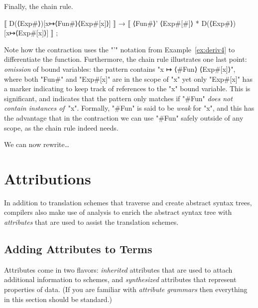 \documentclass[11pt]{article} %
\begin{document}
\begin{example}
  Finally, the chain rule.
\begin{code}[firstnumber=last]
⟦ D(⟨Exp#⟩)[x↦⟨Fun#⟩⟨Exp#[x]⟩] ⟧ → ⟦ ⟨Fun#⟩' ⟨Exp#[#]⟩ * D(⟨Exp#⟩)[x↦⟨Exp#[x]⟩] ⟧ ;
\end{code}
  Note how the contraction uses the "'" notation from Example~\ref{ex:deriv4} to differentiate the
  function.  Furthermore, the chain rule illustrates one last point: \emph{omission} of bound
  variables: the pattern contains "x ↦ ⟨#Fun⟩ ⟨Exp#[x]⟩", where both "Fun#" and "Exp#[x]" are in the
  scope of "x" yet only "Exp#[x]" has a marker indicating to keep track of references to the "x"
  bound variable.  This is significant, and indicates that the pattern only matches if "#Fun"
  \emph{does not contain instances of}~"x". Formally, "#Fun" is said to be \emph{weak} for "x", and
  this has the advantage that in the contraction we can use "#Fun" safely outside of any scope, as
  the chain rule indeed needs.
\end{example}

We can now rewrite…\TBD



\section{Attributions}
\label{sec:attribution}

In addition to translation schemes that traverse and create abstract syntax trees, compilers also
make use of analysis to enrich the abstract syntax tree with \emph{attributes} that are used to
assist the translation schemes.

\subsection{Adding Attributes to Terms}

Attributes come in two flavors: \emph{inherited} attributes that are used to attach additional
information to schemes, and \emph{synthesized} attributes that represent properties of data.  (If
you are familiar with \emph{attribute grammars} then everything in this section should be standard.)
\end{document}
